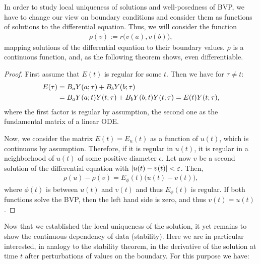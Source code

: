 \begin{remark}
  In order to study local uniqueness of solutions and well-posedness
  of BVP, we have to change our view on boundary conditions and
  consider them as functions of solutions to the differential
  equation. Thus, we will consider the function
  \begin{gather*}
    \rho(v) := r\bigl(v(a),v(b)\bigr),
  \end{gather*}
  mapping solutions of the differential equation to their boundary
  values. $\rho$ is a continuous function, and, as the following
  theorem shows, even differentiable.
\end{remark}



\begin{proof}
  First assume that $E(t)$ is regular for some $t$. Then we have for
  $\tau \neq t$:
  \begin{align*}
    E(\tau) &= \rwaa \fundamental(a;\tau) + \rwab \fundamental(b;\tau)
    \\
    &= \rwaa \fundamental(a;t)\fundamental(t;\tau) + \rwab
    \fundamental(b;t)\fundamental(t;\tau)
    = E(t) \fundamental(t;\tau),
  \end{align*}
  where the first factor is regular by assumption, the second one as the
  fundamental matrix of a linear ODE.

  Now, we consider the matrix $E(t)=E_u(t)$ as a function of $u(t)$, which is
  continuous by assumption. Therefore, if it is regular in $u(t)$, it
  is regular in a neighborhood of $u(t)$ of some positive diameter
  $\epsilon$. Let now $v$ be a second solution of the differential
  equation with $\lvert u(t)-v(t)\rvert<\varepsilon$. Then,
  \begin{gather*}
    \rho(u)-\rho(v) = E_\phi(t) \bigl(u(t)-v(t)\bigr),
  \end{gather*}
  where $\phi(t)$ is between $u(t)$ and $v(t)$ and thus $E_\phi(t)$ is
  regular. If both functions solve the BVP, then the left hand side is
  zero, and thus $v(t)=u(t)$.
\end{proof}

Now that we established the local uniqueness of the solution,
it yet remains to show the continuous dependency of data (stability).  
Here we are in particular interested, in analogy to the 
stability theorem, in the derivative
of the solution at time $t$ after perturbations of values on the boundary. 
For this purpose we have:



